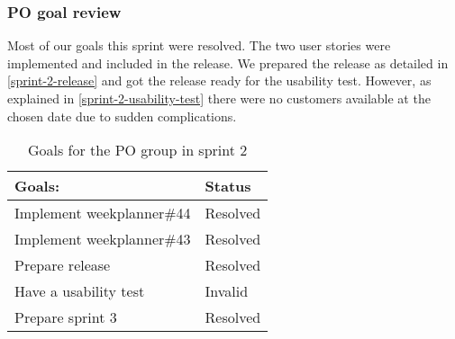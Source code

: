\subsubsection{PO goal review}
Most of our goals this sprint were resolved.
The two user stories were implemented and included in the release. 
We prepared the release as detailed in \autoref{sprint-2-release} and got the release ready for the usability test.
However, as explained in \autoref{sprint-2-usability-test} there were no customers available at the chosen date due to sudden complications.


\begin{table}[H]
    \centering
    \begin{tabular}{|l|l|}
    \hline
    Goals:                                   & Status \\ \hline
    Implement weekplanner\#44                & Resolved  \\ \hline
    Implement weekplanner\#43                & Resolved  \\ \hline
    Prepare release                          & Resolved \\ \hline
    Have a usability test                   & Invalid \\ \hline
    Prepare sprint 3                         & Resolved \\ \hline
    \end{tabular}
    \caption{Goals for the PO group in sprint 2}
    \label{PO-goal-sprint-2-review}
\end{table}
